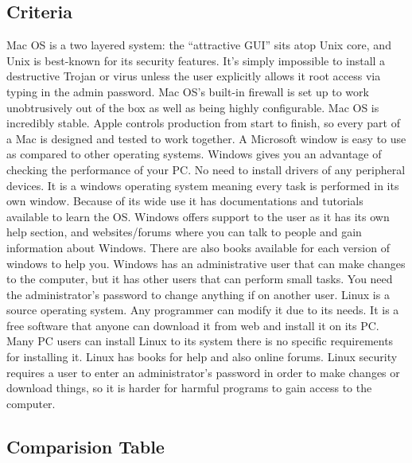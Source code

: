 \documentclass{scrreprt}
\begin{document}
\subsection{Criteria}
Mac OS is a two layered system: the “attractive GUI” sits atop Unix core, and Unix is best-known for its
security features. It’s simply impossible to install a destructive Trojan or virus unless the user explicitly
allows it root access via typing in the admin password. Mac OS’s built-in firewall is set up to work
unobtrusively out of the box as well as being highly configurable. Mac OS is incredibly stable. Apple
controls production from start to finish, so every part of a Mac is designed and tested to work together.
\newline
\newline
A Microsoft window is easy to use as compared to other operating systems. Windows gives you an
advantage of checking the performance of your PC. No need to install drivers of any peripheral devices.
It is a windows operating system meaning every task is performed in its own window. Because of its
wide use it has documentations and tutorials available to learn the OS. Windows offers support to the
user as it has its own help section, and websites/forums where you can talk to people and gain
information about Windows. There are also books available for each version of windows to help you.
Windows has an administrative user that can make changes to the computer, but it has other users that
can perform small tasks. You need the administrator’s password to change anything if on another user.
\newline
\newline
Linux is a source operating system. Any programmer can modify it due to its needs. It is a free software
that anyone can download it from web and install it on its PC. Many PC users can install Linux to its
system there is no specific requirements for installing it. Linux has books for help and also online forums.
Linux security requires a user to enter an administrator’s password in order to make changes or
download things, so it is harder for harmful programs to gain access to the computer.




\subsection{Comparision Table}
\end{document}
